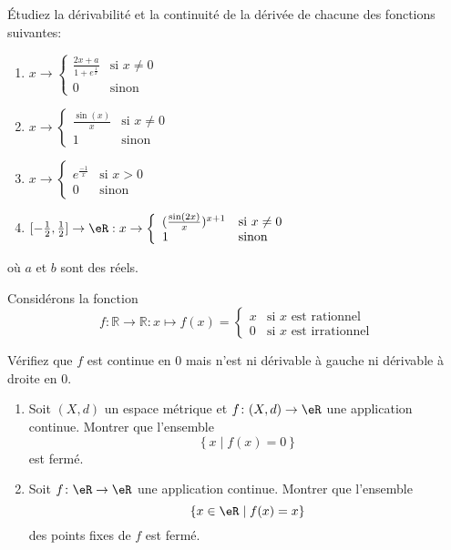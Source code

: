 \exerNico Étudiez la dérivabilité et la continuité
de la dérivée de chacune des fonctions suivantes:
\begin{enumerate}
\item $ x \rightarrow
\left\{ \begin{array}{ll}
\frac{2x+a}{1+e^{\frac{1}{x}}} & \mbox{si } x \not= 0 \\
0 & \mbox{sinon}
\end{array} \right.$
%
\item $ x \rightarrow
\left\{ \begin{array}{ll}
\frac{\sin(x)}{x} & \mbox{si } x \not= 0 \\
1 & \mbox{sinon}
\end{array} \right.$
%
\item $ x \rightarrow
\left\{ \begin{array}{ll}
e^{\frac{-1}{x}} & \mbox{si } x > 0 \\
0 & \mbox{sinon}
\end{array} \right.$
%
\item $ [-\frac{1}{2}, \frac{1}{2}] \rightarrow \eR: x \rightarrow
\left\{ \begin{array}{ll}
(\frac{\sin(2x)}{x})^{x+1} & \mbox{si } x \not= 0 \\
1 & \mbox{sinon}
\end{array} \right.$
\end{enumerate}
où $a$ et $b$ sont des réels.


 \exerNico Considérons la fonction
$$f:\mathbb{R}\rightarrow\mathbb{R}:x\mapsto f(x)=\left\{
\begin{array}{ll}
x&\text{si }x\text{ est rationnel}\\
0&\text{si }x\text{ est irrationnel}
\end{array}
\right.$$

Vérifiez que $f$ est continue en $0$ mais n'est ni dérivable à  gauche ni dérivable à droite en
$0$.

\exerNico
\begin{enumerate}
\item Soit $(X,d)$ un espace métrique et $f \colon (X,d) \to \eR$ une application continue.
Montrer que l'ensemble $$\left\{ x \mid f(x) = 0 \right\}$$ est fermé.

\item Soit $f \colon \eR \to \eR$ une application continue.
Montrer que l'ensemble
$$
\{ x \in \eR \mid f(x) = x\}
$$
des points fixes de $f$ est fermé.

\end{enumerate}

